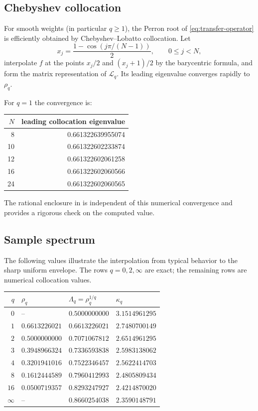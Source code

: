 \documentclass[11pt,oneside]{article}
\theoremstyle{definition}
\theoremstyle{remark}
\begin{document}
\subsection{Chebyshev collocation}

For smooth weights (in particular $q\ge1$), the Perron root of
\eqref{eq:transfer-operator} is efficiently obtained by Chebyshev--Lobatto collocation.
Let
\[
 x_j=\frac{1-\cos(j\pi/(N-1))}{2},\qquad 0\le j<N,
\]
interpolate $f$ at the points $x_j/2$ and $(x_j+1)/2$ by the barycentric formula, and form
the matrix representation of $\mathcal L_q$.  Its leading eigenvalue converges rapidly to
$\rho_q$.

For $q=1$ the convergence is:
\begin{center}
\begin{tabular}{@{}rr@{}}
\toprule
$N$ & leading collocation eigenvalue\\
\midrule
8  & 0.661322639955074\\
10 & 0.661322602233874\\
12 & 0.661322602061258\\
16 & 0.661322602060566\\
24 & 0.661322602060565\\
\bottomrule
\end{tabular}
\end{center}
The rational enclosure in  is independent of this numerical
convergence and provides a rigorous check on the computed value.

\subsection{Sample spectrum}

The following values illustrate the interpolation from typical behavior to the sharp
uniform envelope.  The rows $q=0,2,\infty$ are exact; the remaining rows are numerical
collocation values.

\begin{center}
\begin{tabular}{@{}rlll@{}}
\toprule
$q$ & $\rho_q$ & $\Lambda_q=\rho_q^{1/q}$ & $\kappa_q$\\
\midrule
$0$ & -- & $0.5000000000$ & $3.1514961295$\\
$1$ & $0.6613226021$ & $0.6613226021$ & $2.7480700149$\\
$2$ & $0.5000000000$ & $0.7071067812$ & $2.6514961295$\\
$3$ & $0.3948966324$ & $0.7336593838$ & $2.5983138062$\\
$4$ & $0.3201941016$ & $0.7522346457$ & $2.5622414703$\\
$8$ & $0.1612444589$ & $0.7960412993$ & $2.4805809434$\\
$16$& $0.0500719357$ & $0.8293247927$ & $2.4214870020$\\
$\infty$ & -- & $0.8660254038$ & $2.3590148791$\\
\bottomrule
\end{tabular}
\end{center}
\end{document}
